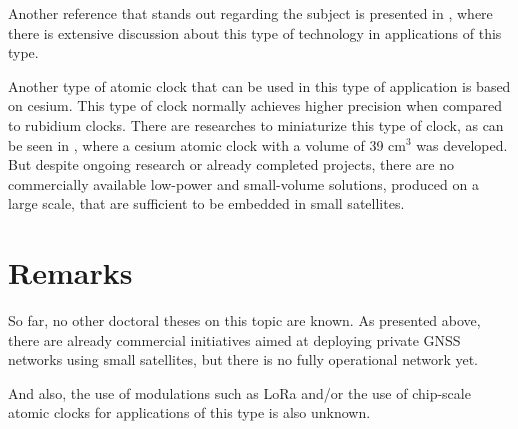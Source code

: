 Another reference that stands out regarding the subject is presented in \cite{saxena2020}, where there is extensive discussion about this type of technology in applications of this type.

Another type of atomic clock that can be used in this type of application is based on cesium. This type of clock normally achieves higher precision when compared to rubidium clocks. There are researches to miniaturize this type of clock, as can be seen in \cite{tanner2013}, where a cesium atomic clock with a volume of 39 cm$^{3}$ was developed. But despite ongoing research or already completed projects, there are no commercially available low-power and small-volume solutions, produced on a large scale, that are sufficient to be embedded in small satellites.

\section{Remarks}



So far, no other doctoral theses on this topic are known. As presented above, there are already commercial initiatives aimed at deploying private GNSS networks using small satellites, but there is no fully operational network yet.

And also, the use of modulations such as LoRa and/or the use of chip-scale atomic clocks for applications of this type is also unknown.